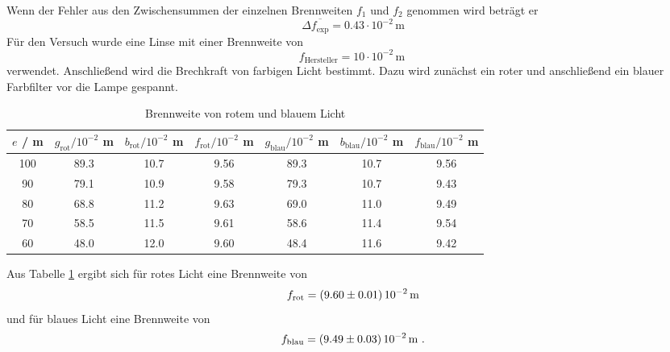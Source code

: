 Wenn der Fehler aus den Zwischensummen der einzelnen Brennweiten $f_1$ und $f_2$ genommen wird beträgt er 
\begin{equation}
  \Delta \overline{f_\text{exp}} = 0.43 \cdot 10^{-2} \, \text{m} 
  \label{eqn:fehlerkomisch}
\end{equation}
Für den Versuch wurde eine Linse mit einer Brennweite von 
\begin{equation}
  f_\text{Hersteller} = 10 \cdot 10^{-2} \, \text{m} \ 
  \label{eqn:fHer}
\end{equation}
verwendet.
Anschließend wird die Brechkraft von farbigen Licht bestimmt. Dazu wird zunächst ein roter und anschließend ein blauer Farbfilter vor die Lampe gespannt.
\begin{table}
  \centering
  \begin{tabular}{c | c c c || c c c}
    \toprule
    $e$ / m & $g_\text{rot} / 10^{-2}$ m & $b_\text{rot} / 10^{-2}$ m & $f_\text{rot} / 10^{-2}$ m & $g_\text{blau} / 10^{-2}$ m & $b_\text{blau} / 10^{-2}$ m & $f_\text{blau} / 10^{-2}$ m \\
    \midrule
    100	& 89.3	& 10.7	& 9.56&	89.3 & 10.7 & 9.56	\\
    90	& 79.1	& 10.9	& 9.58& 79.3 & 10.7 & 9.43	\\
    80	& 68.8	& 11.2	& 9.63& 69.0 & 11.0 & 9.49	\\
    70	& 58.5	& 11.5	& 9.61& 58.6 & 11.4 & 9.54	\\
    60	& 48.0	& 12.0	& 9.60& 48.4 & 11.6 & 9.42	\\
    \bottomrule
  \end{tabular}
  \caption{Brennweite von rotem und blauem Licht}
  \label{tab:fbesslf}
\end{table}
Aus Tabelle \ref{tab:fbesslf} ergibt sich für rotes Licht eine Brennweite von
\begin{equation}
  f_\text{rot} = (\num{9.60 +- 0.01}) \, 10^{-2} \, \text{m}
  \label{eqn:frot}
\end{equation} 
und für blaues Licht eine Brennweite von 
\begin{equation}
  f_\text{blau} = (\num{9.49 +- 0.03}) \, 10^{-2} \, \text{m} \ .
  \label{fblau}
\end{equation}

